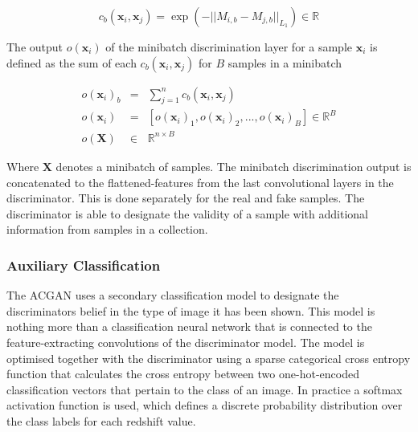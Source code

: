 \documentclass[twocolumn]{article}
\numberwithin{equation}{section}
\begin{document}
\begin{equation}
    c_b(\mathbf{x}_i, \mathbf{x}_j) = \exp({- ||M_{i,b} - M_{j,b}||_{L_1}}) \in \mathbb{R} \nonumber
\end{equation}

The output $o(\mathbf{x}_i)$ of the minibatch discrimination layer for a sample $\mathbf{x}_i$ is defined as the sum of 
each $c_b(\mathbf{x}_i, \mathbf{x}_j)$ for $B$ samples in a minibatch

\begin{eqnarray}
    o(\mathbf{x}_i)_b &=& \sum_{j=1}^n c_b(\mathbf{x}_i, \mathbf{x}_j) \nonumber \\
    o(\mathbf{x}_i) &=& [o(\mathbf{x}_i)_1, o(\mathbf{x}_i)_2, ..., o(\mathbf{x}_i)_B] \in \mathbb{R}^B \nonumber\\
    o(\mathbf{X}) &\in& \mathbb{R}^{n \times B} \nonumber
\end{eqnarray}

Where $\mathbf{X}$ denotes a minibatch of samples. The minibatch discrimination output is concatenated to the 
flattened-features from the last convolutional layers in the discriminator. This is done separately for the real and 
fake samples. The discriminator is able to designate the validity of a sample with additional information from samples 
in a collection.


\subsubsection{Auxiliary Classification}
The ACGAN uses a secondary classification model to designate the discriminators belief in the type of image it has been 
shown. This model is nothing more than a classification neural network that is connected to the feature-extracting 
convolutions of the discriminator model. The model is optimised together with the discriminator using a sparse categorical
cross entropy function that calculates the cross entropy between two one-hot-encoded classification vectors that pertain 
to the class of an image. In practice a softmax activation function is used, which defines a discrete probability 
distribution over the class labels for each redshift value. 
\end{document}
